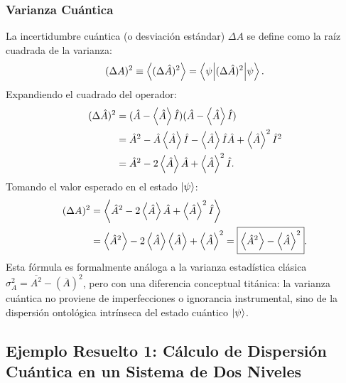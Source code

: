 \subsubsection{Varianza Cuántica}
La incertidumbre cuántica (o desviación estándar) $\Delta A$ se define como la raíz cuadrada de la varianza:
\begin{equation}
    (\Delta A)^2 \equiv \left\langle (\Delta\hat{A})^2 \right\rangle = \left\langle \psi \middle| (\Delta\hat{A})^2 \middle| \psi \right\rangle.
    \label{eq:variance_def}
\end{equation}
Expandiendo el cuadrado del operador:
\begin{align}
    (\Delta\hat{A})^2 &= (\hat{A} - \left\langle \hat{A} \right\rangle\hat{I})(\hat{A} - \left\langle \hat{A} \right\rangle\hat{I}) \nonumber\\
    &= \hat{A}^2 - \hat{A}\left\langle \hat{A} \right\rangle\hat{I} - \left\langle \hat{A} \right\rangle\hat{I}\hat{A} + \left\langle \hat{A} \right\rangle^2 \hat{I}^2 \nonumber\\
    &= \hat{A}^2 - 2\left\langle \hat{A} \right\rangle\hat{A} + \left\langle \hat{A} \right\rangle^2 \hat{I}.
\end{align}
Tomando el valor esperado en el estado $\left| \psi \right\rangle$:
\begin{align}
    (\Delta A)^2 &= \left\langle \hat{A}^2 - 2\left\langle \hat{A} \right\rangle\hat{A} + \left\langle \hat{A} \right\rangle^2 \hat{I} \right\rangle \nonumber\\
    &= \left\langle \hat{A}^2 \right\rangle - 2\left\langle \hat{A} \right\rangle\left\langle \hat{A} \right\rangle + \left\langle \hat{A} \right\rangle^2 = \boxed{\left\langle \hat{A}^2 \right\rangle - \left\langle \hat{A} \right\rangle^2}.
    \label{eq:variance_expanded}
\end{align}
Esta fórmula es formalmente análoga a la varianza estadística clásica $\sigma_A^2 = \overline{A^2} - (\overline{A})^2$, pero con una diferencia conceptual titánica: la varianza cuántica no proviene de imperfecciones o ignorancia instrumental, sino de la dispersión ontológica intrínseca del estado cuántico $\left| \psi \right\rangle$.

\subsection{Ejemplo Resuelto 1: Cálculo de Dispersión Cuántica en un Sistema de Dos Niveles}

